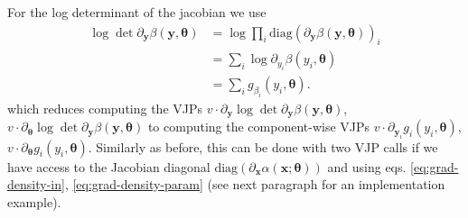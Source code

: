 \documentclass{article}
\begin{document}
For the log determinant of the jacobian we use
\begin{align}
    \log \det \partial_{\bm y} \beta(\bm y, \bm \theta) 
    &= \log \prod_{i} \mathrm{diag}(\partial_{\bm y} \beta(\bm y, \bm \theta))_{i} \\
    &=\sum_{i} \log \partial_{y_{i}} \beta(y_{i}, \bm \theta)\\
    &= \sum_{i} g_{\beta_{i}}(y_i, \bm \theta).
\end{align}
which reduces computing the VJPs $v \cdot \partial_{\bm y} \log \det \partial_{\bm y} \beta(\bm y, \bm \theta)$, $v \cdot \partial_{\bm \theta} \log \det \partial_{\bm y} \beta(\bm y, \bm \theta)$ to computing the component-wise VJPs $v \cdot \partial_{\bm y_{i}} g_{i}(y_{i}, \bm \theta)$, $v \cdot \partial_{\bm \theta} g_{i}(y_{i}, \bm \theta)$. Similarly as before, this can be done with two VJP calls if we have access to the Jacobian diagonal $\mathrm{diag}\left( \partial_{\bm x} \alpha(\bm x; \bm \theta)\right)$ and using eqs. \eqref{eq:grad-density-in}, \eqref{eq:grad-density-param} (see next paragraph for an implementation example).






\end{document}
